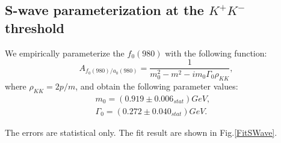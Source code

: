 \subsection{S-wave parameterization at the $K^{+}K^{-}$ threshold}
\label{MIPPWA-RES}
\par{We empirically parameterize the $f_{0}(980)$ with the following function:
    \begin{equation}
        A_{f_{0}(980) / a_{0}(980)} = \frac{1}{m_{0}^{2} - m^{2} -im_{0}\Gamma_{0}\rho_{KK}}, \label{a0980-RBW}
    \end{equation}
    where $\rho_{KK} = 2p/m$, and obtain the following parameter values:
    \begin{equation}
        \begin{array}{lr}
            m_{0} = (0.919 \pm 0.006_{stat}) GeV, &\\
            \Gamma_{0} = (0.272 \pm 0.040_{stat}) GeV. &
        \end{array}\label{S-wave parameters} 
    \end{equation}


    The errors are statistical only. The fit result are shown in Fig.\ref{FitSWave}.
    
}

